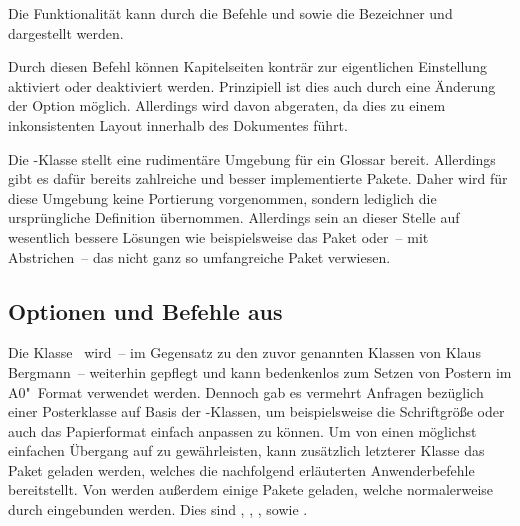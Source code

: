 \begin{DeclareEntity}{}
\begin{Declaration}
Die Funktionalität kann durch die Befehle  
und  sowie die Bezeichner  und 
 dargestellt werden.
\end{Declaration}

\begin{Declaration}
  {}
\printdeclarationlist

Durch diesen Befehl können Kapitelseiten konträr zur eigentlichen Einstellung 
aktiviert oder deaktiviert werden. Prinzipiell ist dies auch durch eine 
Änderung der Option  möglich. Allerdings wird davon 
abgeraten, da dies zu einem inkonsistenten Layout innerhalb des Dokumentes 
führt.
\end{Declaration}

\begin{Declaration}
  {}
\begin{Declaration}
  {}
\printdeclarationlist

Die -Klasse stellt eine rudimentäre Umgebung für ein Glossar 
bereit. Allerdings gibt es dafür bereits zahlreiche und besser implementierte 
Pakete. Daher wird für diese Umgebung keine Portierung vorgenommen, sondern 
lediglich die ursprüngliche Definition übernommen. Allerdings sein an dieser 
Stelle auf wesentlich bessere Lösungen wie beispielsweise das Paket 
 oder~-- mit Abstrichen~-- das nicht ganz so umfangreiche 
Paket  verwiesen.
\end{Declaration}
\end{Declaration}
%



\subsection{%
  Optionen und Befehle aus %
}

%
Die Klasse~ wird~-- im Gegensatz zu den zuvor genannten 
Klassen von Klaus Bergmann~-- weiterhin gepflegt und kann bedenkenlos zum 
Setzen von Postern im A0"~Format verwendet werden. Dennoch gab es vermehrt 
Anfragen bezüglich einer Posterklasse auf Basis der \TUDScript-Klassen, um 
beispielsweise die Schriftgröße oder auch das Papierformat einfach anpassen zu 
können. Um von  einen möglichst einfachen Übergang auf 
 zu gewährleisten, kann zusätzlich letzterer Klasse das 
Paket  geladen werden, welches die nachfolgend erläuterten 
Anwenderbefehle bereitstellt. Von  werden außerdem einige 
Pakete geladen, welche normalerweise durch  eingebunden 
werden. Dies sind , , , 
 sowie .


\end{DeclareEntity}
